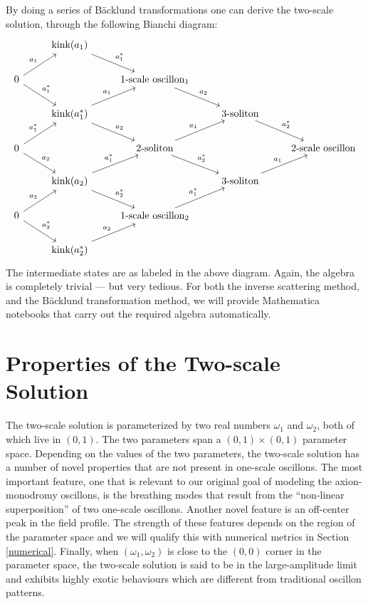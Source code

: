 \documentclass{report}
\begin{document}
By doing a series of B\"acklund transformations one can derive the two-scale solution, through the following Bianchi diagram:
\[
\begin{tikzcd}
  & \text{kink}(a_1) \arrow{dr}{a_1^*} &&\\
 0 \arrow{ur}{a_1} \arrow{dr}{a_1^*} & &\text{1-scale oscillon}_1\arrow{dr}{a_2}&\\
  & \text{kink}(a_1^*) \arrow{ur}{a_1} \arrow{dr}{a_2} && \text{3-soliton}\arrow{dr}{a_2^*}&\\
 0 \arrow{ur}{a_1^*} \arrow{dr}{a_2} &&\text{2-soliton}\arrow{ur}{a_1}\arrow{dr}{a_2^*}&&\text{2-scale oscillon}\\
 &\text{kink}(a_2)\arrow{ur}{a_1^*}\arrow{dr}{a_2^*}&&\text{3-soliton}\arrow{ur}{a_1}\\
 0\arrow{ur}{a_2}\arrow{dr}{a_2^*}&&\text{1-scale oscillon}_2\arrow{ur}{a_1^*}\\
 &\text{kink}(a_2^*)\arrow{ur}{a_2}&&
\end{tikzcd}
\]
The intermediate states are as labeled in the above diagram. Again, the algebra is completely trivial --- but very tedious.
\medbreak
For both the inverse scattering method, and the B\"acklund transformation method, we will provide Mathematica notebooks that carry out the required algebra automatically.

\chapter{Properties of the Two-scale Solution}
The two-scale solution is parameterized by two real numbers $\omega_1$ and $\omega_2$, both of which live in $(0,1)$. The two parameters span a $(0,1)\times(0,1)$ parameter space. Depending on the values of the two parameters, the two-scale solution has a number of novel properties that are not present in one-scale oscillons. The most important feature, one that is relevant to our original goal of modeling the axion-monodromy oscillons, is the breathing modes that result from the ``non-linear superposition'' of two one-scale oscillons. Another novel feature is an off-center peak in the field profile. The strength of these features depends on the region of the parameter space and we will qualify this with numerical metrics in Section \ref{numerical}. Finally, when $(\omega_1,\omega_2)$ is close to the $(0,0)$ corner in the parameter space, the two-scale solution is said to be in the large-amplitude limit and exhibits highly exotic behaviours which are different from traditional oscillon patterns.
\end{document}
